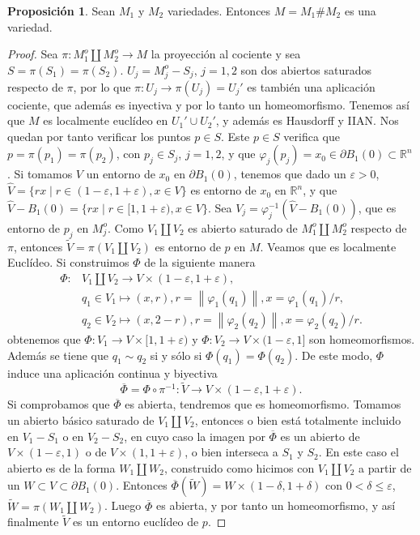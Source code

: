 \documentclass[10pt]{report}
\newcommand{\R}{\mathbb{R}}
\newcommand{\norm}[1]{\left\lVert#1\right\rVert} %
\theoremstyle{definition}
\newtheorem{prop}[defin]{Proposición}
\begin{document}
\begin{prop}\label{prop:suma_conexa}%
Sean $M_1$ y $M_2$ variedades. Entonces $M=M_1\#M_2$ es una variedad.
\end{prop}
\begin{proof}

Sea $\pi:M_1^o\amalg M_2^o\to M$ la proyección al cociente y sea $S=\pi (S_1)=\pi (S_2)$.  $U_j=M_j^o-S_j$, $j=1,2$ son dos abiertos saturados respecto de $\pi$, por lo que $\pi :U_ j\to \pi (U_j)=U_j'$ es también una aplicación cociente, que además es inyectiva y por lo tanto un homeomorfismo. Tenemos así que $M$ es localmente euclídeo en $U_1'\cup U_2'$, y además es Hausdorff y IIAN. Nos quedan por tanto verificar los puntos $p\in S$.
Este $p\in S$ verifica que $p=\pi (p_1)=\pi (p_2)$, con $p_j\in S_j$, $j=1,2$, y que  $\varphi_j(p_j)=x_0 \in \partial B_1(0) \subset \R^n$. Si tomamos $V$ un entorno de $x_0$ en $\partial B_1(0)$, tenemos que dado un $\varepsilon >0$, $\hat{V}=\{rx\mid   r\in (1-\varepsilon , 1+\varepsilon ), x\in V\} $ es entorno de $x_0$ en $\R^n$, y que $\hat{V}-B_1(0)=\{rx\mid r\in [1, 1+\varepsilon ), x \in V\}$. Sea $V_j=\varphi_j^{-1}(\hat{V}-B_1(0))$, que es entorno de $p_j$ en $M_j^o$. Como $ V_1\amalg V_2$ es abierto saturado de $M_1^o\amalg M_2^o$ respecto de $\pi$, entonces $\tilde{V}=\pi (V _1\amalg V_2)$ es entorno de $p$ en $M$. Veamos que es localmente Euclídeo. Si construimos $\Phi$ de la siguiente manera
\begin{align*}
\Phi : &  V_1\amalg V_2  \to  V\times (1-\varepsilon , 1+ \varepsilon ), \\
& q_1\in  V_1  \mapsto  (x,r), r=\norm{\varphi_1(q_1)}, x=\varphi_1(q_1)/r,\\
& q_2\in V_2  \mapsto  (x,2-r), r= \norm{\varphi_2(q_2)}, x= \varphi_2(q_2)/r.
\end{align*}
obtenemos que $\Phi :  V_1 \to V \times [1, 1+\varepsilon)$ y $\Phi : V_2 \to V \times (1- \varepsilon, 1]$ son homeomorfismos. Además se tiene que $q_1 \sim q_2$ si y sólo si $\Phi(q_1)=\Phi(q_2)$.  De este modo, $\Phi$ induce una aplicación continua y biyectiva $$\overline{\Phi}=\Phi \circ \pi^{-1}: \tilde{V} \to V \times (1- \varepsilon, 1+ \varepsilon).$$
Si comprobamos que $\overline{\Phi}$ es abierta, tendremos que es homeomorfismo. Tomamos un abierto básico saturado de $V_1\amalg V_2$, entonces o bien está totalmente incluido en $V_1-S_1$ o en $V_2-S_2$, en cuyo caso la imagen por $\overline{\Phi}$ es un abierto de $V\times (1-\varepsilon ,1)$ o de $V\times (1,1+\varepsilon )$, o bien interseca a $S_1$ y $S_2$. En este caso el abierto es de la forma $W_1\amalg W_2$, construido como hicimos con $V_1\amalg V_2$ a partir de un $W\subset V \subset \partial B_1(0)$. Entonces $\overline{\Phi} (\tilde{W})= W \times (1-\delta , 1+\delta )$ con $0<\delta \leq \varepsilon$, $\tilde{W} = \pi (W_1 \amalg W_2)$. Luego $\overline{\Phi}$ es abierta, y por tanto un homeomorfismo, y así finalmente $\tilde{V}$ es un entorno euclídeo de $p$. 


\end{proof}
\end{document}
